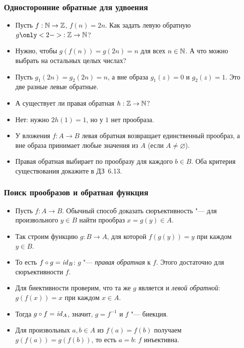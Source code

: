 \documentclass[10pt]{beamer}
\begin{document}
\begin{frame}
    \frametitle{Односторонние обратные для удвоения}
    \begin{itemize}
        \item Пусть $f:\mathbb{N}\to\mathbb{Z}$, $f(n)=2n$. Как задать левую обратную $g\only<2->{:\Z\to\N}$?
        \item<3-> Нужно, чтобы $g(f(n))=g(2n)=n$ для всех $n\in\mathbb{N}$. А что можно выбрать на остальных целых числах?
        \item<4-> Пусть $g_1(2n)=g_2(2n)=n$, а вне образа $g_1(z)=0$ и $g_2(z)=1$. Это две разные левые обратные.
        \item<5-> А существует ли правая обратная $h:\mathbb{Z}\to\mathbb{N}$?
        \item<6-> Нет: нужно $2h(1)=1$, но у $1$ нет прообраза.
        \item<7-> У вложения $f:A\to B$ левая обратная возвращает единственный прообраз, а вне образа принимает любые значения из $A$ (если $A\ne\varnothing$).
        \item<8-> Правая обратная выбирает по прообразу для каждого $b\in B$. Оба критерия существования докажите в ДЗ~6.13.
    \end{itemize}
\end{frame}

\begin{frame}
    \frametitle{Поиск прообразов и обратная функция}
    \begin{itemize}
        \item Пусть $f:A\to B$. Обычный способ доказать сюръективность "--- для произвольного $y\in B$ найти прообраз $x=g(y)\in A$.
        \item<2-> Так строим функцию $g:B\to A$, для которой $f(g(y))=y$ при каждом $y\in B$.
        \item<3-> То есть $f\circ g=\mathit{id}_B$: $g$ "--- \emph{правая обратная} к $f$. Этого достаточно для сюръективности $f$.
        \item<4-> Для биективности проверим, что та же $g$ является и \emph{левой обратной}: $g(f(x))=x$ при каждом $x\in A$.
        \item<5-> Тогда $g\circ f=\mathit{id}_A$, значит, $g=f^{-1}$ и $f$ "--- биекция.
        \item<6-> Для произвольных $a,b\in A$ из $f(a)=f(b)$ получаем $g(f(a))=g(f(b))$, то есть $a=b$: $f$ инъективна.
    \end{itemize}
\end{frame}
\end{document}

